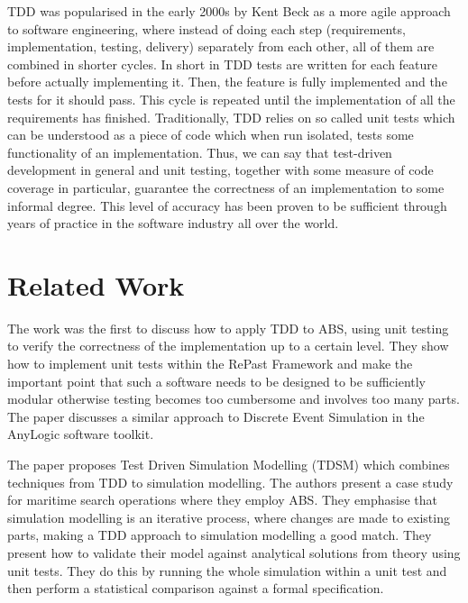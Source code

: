 TDD was popularised in the early 2000s by Kent Beck \cite{beck_test_2002} as a more agile approach to software engineering, where instead of doing each step (requirements, implementation, testing, delivery) separately from each other, all of them are combined in shorter cycles. In short in TDD tests are written for each feature before actually implementing it. Then, the feature is fully implemented and the tests for it should pass. This cycle is repeated until the implementation of all the requirements has finished. Traditionally, TDD relies on so called unit tests which can be understood as a piece of code which when run isolated, tests some functionality of an implementation. Thus, we can say that test-driven development in general and unit testing, together with some measure of code coverage in particular, guarantee the correctness of an implementation to some informal degree. This level of accuracy has been proven to be sufficient through years of practice in the software industry all over the world. 

\medskip

\section{Related Work}
The work \cite{collier_test-driven_2013} was the first to discuss how to apply TDD to ABS, using unit testing to verify the correctness of the implementation up to a certain level. They show how to implement unit tests within the RePast Framework \cite{north_complex_2013} and make the important point that such a software needs to be designed to be sufficiently modular otherwise testing becomes too cumbersome and involves too many parts. The paper \cite{asta_investigation_2014} discusses a similar approach to Discrete Event Simulation in the AnyLogic software toolkit. 

The paper \cite{onggo_test-driven_2016} proposes Test Driven Simulation Modelling (TDSM) which combines techniques from TDD to simulation modelling. The authors present a case study for maritime search operations where they employ ABS. They emphasise that simulation modelling is an iterative process, where changes are made to existing parts, making a TDD approach to simulation modelling a good match. They present how to validate their model against analytical solutions from theory using unit tests. They do this by running the whole simulation within a unit test and then perform a statistical comparison against a formal specification. %

